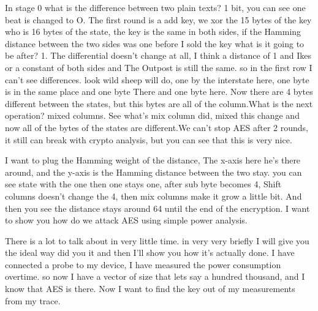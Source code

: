 In stage 0 what is the difference between two plain texts? 1 bit, you can see
one beat is changed to O. The first round is a add key, we xor the 15 bytes of
the key who is 16 bytes of the state, the key is the same in both sides, if the
Hamming distance between the two sides was one before I sold the key what is it
going to be after? 1. The differential doesn't change at all, I think a distance
of 1 and Ikes or a constant of both sides and The Outpost is still the same. so
in the first row I can't see differences. look wild sheep will do, one by the
interstate here, one byte is in the same place and one byte There and one byte
here. Now there are 4 bytes different between the states, but this bytes are all
of the column.What is the next operation? mixed columns. See what's mix column
did, mixed this change and now all of the bytes of the states are different.We
can't stop AES after 2 rounds, it still can break with crypto analysis, but you
can see that this is very nice.
 
I want to plug the Hamming weight of the distance, The x-axis here he's there
around, and the y-axis is the Hamming distance between the two stay. you can see
state with the one then one stays one, after sub byte becomes 4, Shift columns
doesn't change the 4, then mix columns make it grow a little bit. And then you
see the distance stays around 64 until the end of the encryption. I want to show
you how do we attack AES using simple power analysis.

There is a lot to talk about in very little time. in very very briefly I will
give you the ideal way did you it and then I'll show you how it's actually done.
I have connected a probe to my device, I have measured the power consumption
overtime. so now I have a vector of size that lets say a hundred thousand, and I
know that AES is there. Now I want to find the key out of my measurements from
my trace.

